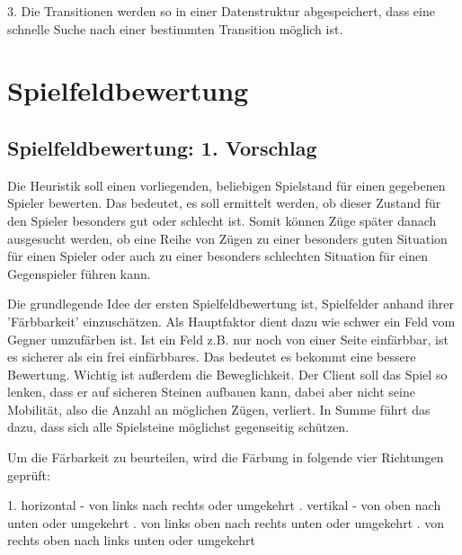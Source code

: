 \documentclass[12pt,a4paper,bibliography=totocnumbered,listof=totocnumbered]{scrartcl}
\begin{document}
    3. Die Transitionen werden so in einer Datenstruktur abgespeichert, dass eine schnelle Suche nach einer bestimmten Transition möglich ist.


    \newpage
    \section{Spielfeldbewertung}
    \subsection{Spielfeldbewertung: 1. Vorschlag}
    \vspace{1em}
    Die Heuristik soll einen vorliegenden, beliebigen Spielstand für einen gegebenen Spieler bewerten. Das bedeutet, es soll ermittelt werden, ob dieser Zustand für den Spieler besonders gut oder schlecht ist. Somit können Züge später danach ausgesucht werden, ob eine Reihe von Zügen zu einer besonders guten Situation für einen Spieler oder auch zu einer besonders schlechten Situation für einen Gegenspieler führen kann.

    Die grundlegende Idee der ersten Spielfeldbewertung ist, Spielfelder anhand ihrer 'Färbbarkeit' einzuschätzen. Als Hauptfaktor dient dazu wie schwer ein Feld vom Gegner umzufärben ist. Ist ein Feld z.B. nur noch von einer Seite einfärbbar, ist es sicherer als ein frei einfärbbares. Das bedeutet es bekommt eine bessere Bewertung. Wichtig ist außerdem die Beweglichkeit. Der Client soll das Spiel so lenken, dass er auf sicheren Steinen aufbauen kann, dabei aber nicht seine Mobilität, also die Anzahl an möglichen Zügen, verliert. In Summe führt das dazu, dass sich alle Spielsteine möglichst gegenseitig schützen.


    Um die Färbarkeit zu beurteilen, wird die Färbung in folgende vier Richtungen geprüft:

    1. horizontal - von links nach rechts oder umgekehrt . vertikal - von oben nach unten oder umgekehrt . von links oben nach rechts unten oder umgekehrt . von rechts oben nach links unten oder umgekehrt \newline
\end{document}
